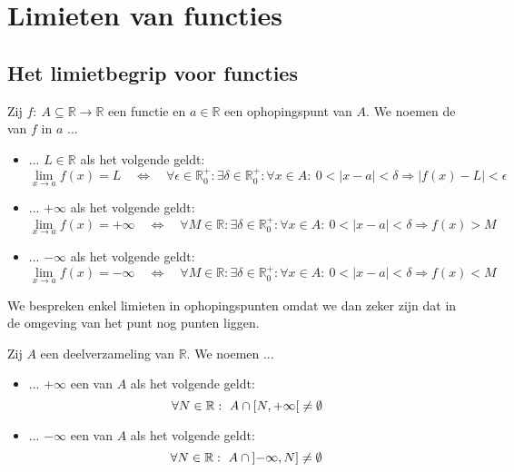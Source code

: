 \documentclass[main.tex]{subfiles}
\begin{document}
\section{Limieten van functies}
\label{sec:limi-van-funct}

\subsection{Het limietbegrip voor functies}

\begin{de}
  Zij $f:\ A \subseteq \mathbb{R} \rightarrow \mathbb{R}$ een functie en $a\in \mathbb{R}$ een ophopingspunt van $A$.
  We noemen de  van $f$ in $a$ ...
  \begin{itemize}
  \item ... $L\in \mathbb{R}$ als het volgende geldt:
    \[
    \lim_{x\rightarrow a}f(x) = L \quad\Leftrightarrow\quad
    \forall \epsilon \in \mathbb{R}_{0}^{+}: \exists \delta \in \mathbb{R}_{0}^{+}: \forall x\in A:\ 0 < |x-a| < \delta \Rightarrow |f(x) - L| < \epsilon
    \]
  \item ... $+\infty$ als het volgende geldt:
    \[
    \lim_{x\rightarrow a}f(x) = +\infty\quad\Leftrightarrow\quad
    \forall M \in \mathbb{R}: \exists \delta \in \mathbb{R}_{0}^{+}: \forall x\in A:\ 0 < |x-a| < \delta \Rightarrow f(x) > M
    \]
  \item ... $-\infty$ als het volgende geldt:
    \[
    \lim_{x\rightarrow a}f(x) = -\infty\quad\Leftrightarrow\quad
    \forall M \in \mathbb{R}: \exists \delta \in \mathbb{R}_{0}^{+}: \forall x\in A:\ 0 < |x-a| < \delta \Rightarrow f(x) < M
    \]
  \end{itemize}
\end{de}

\begin{opm}
  We bespreken enkel limieten in ophopingspunten omdat we dan zeker zijn dat in de omgeving van het punt nog punten liggen.
\end{opm}

\begin{de}
  Zij $A$ een deelverzameling van $\mathbb{R}$.
  We noemen ...
  \begin{itemize}
  \item ... $+\infty$ een  van $A$ als het volgende geldt:
    \[ \forall N \in \mathbb{R}:\ A \cap \interval[open right]{N}{+\infty} \neq \emptyset \]
  \item ... $-\infty$ een  van $A$ als het volgende geldt:
    \[ \forall N \in \mathbb{R}:\ A \cap \interval[open left]{-\infty}{N} \neq \emptyset \]
  \end{itemize}
\end{de}
\end{document}
